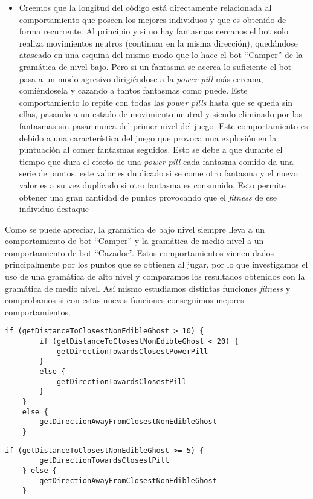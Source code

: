 \begin{itemize}
\item Creemos que la longitud del código está directamente relacionada al comportamiento que poseen los mejores individuos y que es obtenido de forma recurrente. Al principio y si no hay fantasmas cercanos el bot solo realiza movimientos neutros (continuar en la misma dirección), quedándose atascado en una esquina del mismo modo que lo hace el bot ``Camper'' de la gramática de nivel bajo. Pero si un fantasma se acerca lo suficiente el bot pasa a un modo agresivo dirigiéndose a la \textit{power pill} más cercana, comiéndosela y cazando a tantos fantasmas como puede. Este comportamiento lo repite con todas las \textit{power pills} hasta que se queda sin ellas, pasando a un estado de movimiento neutral y siendo eliminado por los fantasmas sin pasar nunca del primer nivel del juego. Este comportamiento es debido a una característica del juego que provoca una explosión en la puntuación al comer fantasmas seguidos. Esto se debe a que durante el tiempo que dura el efecto de una \textit{power pill} cada fantasma comido da una serie de puntos, este valor es duplicado si se come otro fantasma y el nuevo valor es a su vez duplicado si otro fantasma es consumido. Esto permite obtener una gran cantidad de puntos provocando que el \textit{fitness} de ese individuo destaque
\end{itemize}

Como se puede apreciar, la gramática de bajo nivel siempre lleva a un comportamiento de bot ``Camper'' y la gramática de medio nivel a un comportamiento de bot ``Cazador''. Estos comportamientos vienen dados principalmente por los puntos que se obtienen al jugar, por lo que investigamos el uso de una gramática de alto nivel y comparamos los resultados obtenidos con la gramática de medio nivel. Así mismo estudiamos distintas funciones \textit{fitness} y comprobamos si con estas nuevas funciones conseguimos mejores comportamientos.

\begin{lstlisting}[caption={Mejor individuo producido usando la gramática de medio nivel para evolucionar contra Random Ghosts.}]
    if (getDistanceToClosestNonEdibleGhost > 10) {
        if (getDistanceToClosestNonEdibleGhost < 20) {
            getDirectionTowardsClosestPowerPill 
        }
        else {
            getDirectionTowardsClosestPill
        }
    }
    else {
        getDirectionAwayFromClosestNonEdibleGhost
    }
\end{lstlisting}

\begin{lstlisting}[caption={Mejor individuo producido usando la gramática de medio nivel para evolucionar contra Legacy Ghosts.}]
    if (getDistanceToClosestNonEdibleGhost >= 5) {
        getDirectionTowardsClosestPill
    } else {
        getDirectionAwayFromClosestNonEdibleGhost
    }
\end{lstlisting}

